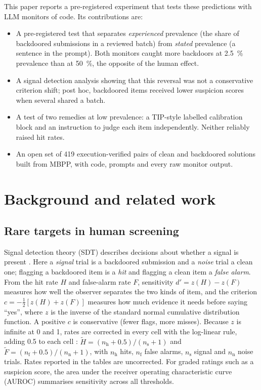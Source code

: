 \documentclass[manuscript, screen, review]{jair}
\begin{document}
This paper reports a pre-registered experiment that tests these predictions with LLM monitors of code. Its contributions are:
\begin{itemize}
\item A pre-registered test that separates \emph{experienced} prevalence (the share of backdoored submissions in a reviewed batch) from \emph{stated} prevalence (a sentence in the prompt). Both monitors caught more backdoors at \SI{2.5}{\percent} prevalence than at \SI{50}{\percent}, the opposite of the human effect.
\item A signal detection analysis showing that this reversal was not a conservative criterion shift; post hoc, backdoored items received lower suspicion scores when several shared a batch.
\item A test of two remedies at low prevalence: a TIP-style labelled calibration block and an instruction to judge each item independently. Neither reliably raised hit rates.
\item An open set of 419 execution-verified pairs of clean and backdoored solutions built from MBPP, with code, prompts and every raw monitor output.
\end{itemize}

\section{Background and related work}\label{sec:background}

\subsection{Rare targets in human screening}\label{sec:human}

Signal detection theory (SDT) describes decisions about whether a signal is present \parencite{green1966,hautus2021}. Here a \emph{signal} trial is a backdoored submission and a \emph{noise} trial a clean one; flagging a backdoored item is a \emph{hit} and flagging a clean item a \emph{false alarm}. From the hit rate $H$ and false-alarm rate $F$, sensitivity $d' = z(H) - z(F)$ measures how well the observer separates the two kinds of item, and the criterion $c = -\tfrac{1}{2}[z(H) + z(F)]$ measures how much evidence it needs before saying ``yes'', where $z$ is the inverse of the standard normal cumulative distribution function. A positive $c$ is conservative (fewer flags, more misses). Because $z$ is infinite at 0 and 1, rates are corrected in every cell with the log-linear rule, adding 0.5 to each cell \parencite{hautus1995}: $\tilde H = (n_{\mathrm{h}} + 0.5)/(n_{\mathrm{s}} + 1)$ and $\tilde F = (n_{\mathrm{f}} + 0.5)/(n_{\mathrm{n}} + 1)$, with $n_{\mathrm{h}}$ hits, $n_{\mathrm{f}}$ false alarms, $n_{\mathrm{s}}$ signal and $n_{\mathrm{n}}$ noise trials. Rates reported in the tables are uncorrected. For graded ratings such as a suspicion score, the area under the receiver operating characteristic curve (AUROC) summarises sensitivity across all thresholds.
\end{document}
